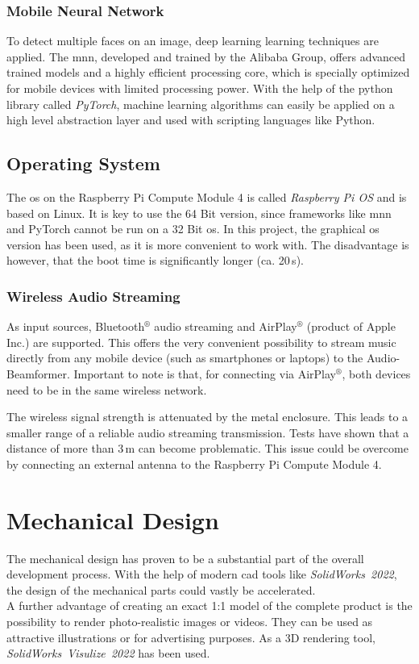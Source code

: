 \subsubsection{Mobile Neural Network}\label{software_mnn}
To detect multiple faces on an image, deep learning learning techniques are applied. The \acrfull{mnn}, developed and trained by the Alibaba Group, offers advanced trained models and a highly efficient processing core, which is specially optimized for mobile devices with limited processing power. With the help of the python library called \mbox{\textit{PyTorch}}, machine learning algorithms can easily be applied on a high level abstraction layer and used with scripting languages like Python.

\subsection{Operating System}
The \acrfull{os} on the Raspberry Pi Compute Module 4 is called \textit{Raspberry Pi OS} and is based on Linux. It is key to use the 64 Bit version, since frameworks like \acrshort{mnn} and PyTorch cannot be run on a 32 Bit \acrshort{os}. In this project, the graphical \acrshort{os} version has been used, as it is more convenient to work with. The disadvantage is however, that the boot time is significantly longer (ca. 20\,s).

\subsubsection{Wireless Audio Streaming}
As input sources, Bluetooth$^{\circledR}$ audio streaming and AirPlay$^{\circledR}$ (product of Apple Inc.) are supported. This offers the very convenient possibility to stream music directly from any mobile device (such as smartphones or laptops) to the Audio-Beamformer. Important to note is that, for connecting via AirPlay$^{\circledR}$, both devices need to be in the same wireless network.

The wireless signal strength is attenuated by the metal enclosure. This leads to a smaller range of a reliable audio streaming transmission. Tests have shown that a distance of more than 3\,m can become problematic. This issue could be overcome by connecting an external antenna to the Raspberry Pi Compute Module 4.

\newpage
\section{Mechanical Design}
The mechanical design has proven to be a substantial part of the overall development process. With the help of modern \acrshort{cad} tools like \mbox{\textit{SolidWorks 2022}}, the design of the mechanical parts could vastly be accelerated.\\
A further advantage of creating an exact 1:1 model of the complete product is the possibility to render photo-realistic images or videos. They can be used as attractive illustrations or for advertising purposes. As a 3D rendering tool, \mbox{\textit{SolidWorks Visulize 2022}} has been used.

